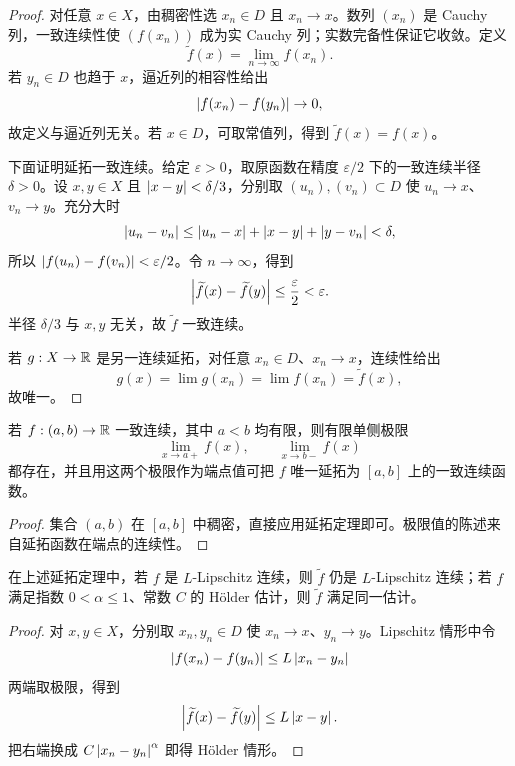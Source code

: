 \begin{proof}
对任意 \(x\in X\)，由稠密性选 \(x_n\in D\) 且 \(x_n\to x\)。数列 \((x_n)\) 是 Cauchy 列，一致连续性使 \((f(x_n))\) 成为实 Cauchy 列；实数完备性保证它收敛。定义
\[
 \widetilde f(x)=\lim_{n\to\infty}f(x_n).
\]
若 \(y_n\in D\) 也趋于 \(x\)，逼近列的相容性给出
\[
 \left|f(x_n)-f(y_n)\right|\to0,
\]
故定义与逼近列无关。若 \(x\in D\)，可取常值列，得到 \(\widetilde f(x)=f(x)\)。

下面证明延拓一致连续。给定 \(\varepsilon>0\)，取原函数在精度 \(\varepsilon/2\) 下的一致连续半径 \(\delta>0\)。设 \(x,y\in X\) 且 \(\left|x-y\right|<\delta/3\)，分别取 \((u_n),(v_n)\subset D\) 使 \(u_n\to x\)、\(v_n\to y\)。充分大时
\[
 \left|u_n-v_n\right|
 \le\left|u_n-x\right|+\left|x-y\right|+\left|y-v_n\right|<\delta,
\]
所以 \(\left|f(u_n)-f(v_n)\right|<\varepsilon/2\)。令 \(n\to\infty\)，得到
\[
 \left|\widetilde f(x)-\widetilde f(y)\right|
 \le\frac{\varepsilon}{2}<\varepsilon.
\]
半径 \(\delta/3\) 与 \(x,y\) 无关，故 \(\widetilde f\) 一致连续。

若 \(g:X\to\mathbb{R}\) 是另一连续延拓，对任意 \(x_n\in D\)、\(x_n\to x\)，连续性给出
\[
 g(x)=\lim g(x_n)=\lim f(x_n)=\widetilde f(x),
\]
故唯一。
\end{proof}

\begin{corollary}[缺失端点的补入]
若 \(f:(a,b)\to\mathbb{R}\) 一致连续，其中 \(a<b\) 均有限，则有限单侧极限
\[
 \lim_{x\to a+}f(x),\qquad \lim_{x\to b-}f(x)
\]
都存在，并且用这两个极限作为端点值可把 \(f\) 唯一延拓为 \([a,b]\) 上的一致连续函数。
\end{corollary}

\begin{proof}
集合 \((a,b)\) 在 \([a,b]\) 中稠密，直接应用延拓定理即可。极限值的陈述来自延拓函数在端点的连续性。
\end{proof}

\begin{proposition}[定量估计在延拓下保持]
在上述延拓定理中，若 \(f\) 是 \(L\)-Lipschitz 连续，则 \(\widetilde f\) 仍是 \(L\)-Lipschitz 连续；若 \(f\) 满足指数 \(0<\alpha\le1\)、常数 \(C\) 的 Hölder 估计，则 \(\widetilde f\) 满足同一估计。
\end{proposition}

\begin{proof}
对 \(x,y\in X\)，分别取 \(x_n,y_n\in D\) 使 \(x_n\to x\)、\(y_n\to y\)。Lipschitz 情形中令
\[
 \left|f(x_n)-f(y_n)\right|\le L\left|x_n-y_n\right|
\]
两端取极限，得到
\[
 \left|\widetilde f(x)-\widetilde f(y)\right|\le L\left|x-y\right|.
\]
把右端换成 \(C\left|x_n-y_n\right|^{\alpha}\) 即得 Hölder 情形。
\end{proof}

